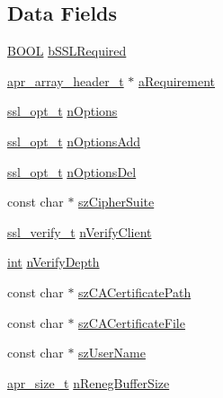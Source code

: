 \subsection*{Data Fields}
\begin{DoxyCompactItemize}
\item 
\hyperlink{pcre__internal_8h_a050c65e107f0c828f856a231f4b4e788}{B\+O\+OL} \hyperlink{structSSLDirConfigRec_a00aa1231f0f2ac4bee71e57200c25bca}{b\+S\+S\+L\+Required}
\item 
\hyperlink{structapr__array__header__t}{apr\+\_\+array\+\_\+header\+\_\+t} $\ast$ \hyperlink{structSSLDirConfigRec_ad4e8ef58d36e34c0bcf451c9d445ca75}{a\+Requirement}
\item 
\hyperlink{group__MOD__SSL__PRIVATE_ga8f8f6b4f4f8d30522eb1f6768070dd8a}{ssl\+\_\+opt\+\_\+t} \hyperlink{structSSLDirConfigRec_a50695711c7c4fca0eddbb421e8620b61}{n\+Options}
\item 
\hyperlink{group__MOD__SSL__PRIVATE_ga8f8f6b4f4f8d30522eb1f6768070dd8a}{ssl\+\_\+opt\+\_\+t} \hyperlink{structSSLDirConfigRec_a167af9c601cde467f571122610e38e05}{n\+Options\+Add}
\item 
\hyperlink{group__MOD__SSL__PRIVATE_ga8f8f6b4f4f8d30522eb1f6768070dd8a}{ssl\+\_\+opt\+\_\+t} \hyperlink{structSSLDirConfigRec_ada9804066af2d93343fa565d400a444f}{n\+Options\+Del}
\item 
const char $\ast$ \hyperlink{structSSLDirConfigRec_a48d61d7582a6886de0760b5ae3b31e22}{sz\+Cipher\+Suite}
\item 
\hyperlink{group__MOD__SSL__PRIVATE_ga5473d623bb868c0030b9d21ff13b04f5}{ssl\+\_\+verify\+\_\+t} \hyperlink{structSSLDirConfigRec_a14e467401d7c727ed0ccac9482b29704}{n\+Verify\+Client}
\item 
\hyperlink{pcre_8txt_a42dfa4ff673c82d8efe7144098fbc198}{int} \hyperlink{structSSLDirConfigRec_ab3ebb05dce625ae0144232bed6b02dfe}{n\+Verify\+Depth}
\item 
const char $\ast$ \hyperlink{structSSLDirConfigRec_a26f71d91612800b5c8a21c329f425283}{sz\+C\+A\+Certificate\+Path}
\item 
const char $\ast$ \hyperlink{structSSLDirConfigRec_a457e2cfebfe6eba810c4ba870b001a0e}{sz\+C\+A\+Certificate\+File}
\item 
const char $\ast$ \hyperlink{structSSLDirConfigRec_af6b8cdb7590580d6977dd780c455842a}{sz\+User\+Name}
\item 
\hyperlink{group__apr__platform_gaaa72b2253f6f3032cefea5712a27540e}{apr\+\_\+size\+\_\+t} \hyperlink{structSSLDirConfigRec_a980cac82c62111733035a55c90eacba4}{n\+Reneg\+Buffer\+Size}
\end{DoxyCompactItemize}


